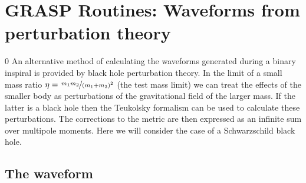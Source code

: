 %
%
%
%
%
%
%
%
%
%
%
%
 \DeclareRobustCommand{\nicefrac}[2]{\hspace{0.1em}%
  \raisebox{0.5ex}{${\scriptstyle
#1}$}\hspace{-0.1em}/\hspace{-0.07em}%
  \mbox{${\scriptstyle #2}$}}
\section{GRASP Routines: Waveforms from perturbation theory}
\label{s:BHPT}
\setcounter{equation}0
An alternative method of calculating the waveforms generated during a binary
inspiral is provided by black hole perturbation theory.
In the limit of a small mass ratio $\eta = \nicefrac{m_1 m_2}{(m_1 + m_2)^2}$ (the
test mass limit) we can treat the effects of the smaller body as perturbations of
the gravitational field of the larger mass. If the latter is a black hole then
the Teukolsky formalism \cite{teukolsky:1973} can be used to calculate these perturbations.
The corrections to 
the metric are then expressed as an infinite sum over multipole 
moments. Here we will consider the case of a Schwarzschild black hole.

\subsection{The waveform}

